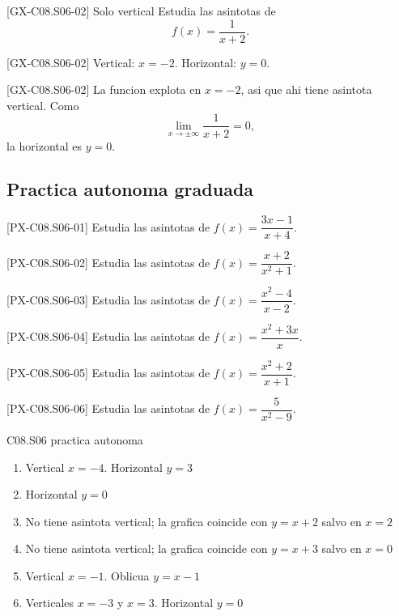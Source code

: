 \begin{guidedexercise}{[GX-C08.S06-02] Solo vertical}
Estudia las asintotas de
\[
f(x)=\frac{1}{x+2}.
\]
\end{guidedexercise}

\begin{shortanswer}{[GX-C08.S06-02]}
Vertical: \(x=-2\). Horizontal: \(y=0\).
\end{shortanswer}

\begin{fullsolution}{[GX-C08.S06-02]}
La funcion explota en \(x=-2\), asi que ahi tiene asintota vertical. Como
\[
\lim_{x\to\pm\infty}\frac{1}{x+2}=0,
\]
la horizontal es \(y=0\).
\end{fullsolution}

\subsection*{Practica autonoma graduada}
\begin{exercise}{[PX-C08.S06-01] Estudia las asintotas de \(f(x)=\dfrac{3x-1}{x+4}\).}
\end{exercise}
\begin{exercise}{[PX-C08.S06-02] Estudia las asintotas de \(f(x)=\dfrac{x+2}{x^2+1}\).}
\end{exercise}
\begin{exercise}{[PX-C08.S06-03] Estudia las asintotas de \(f(x)=\dfrac{x^2-4}{x-2}\).}
\end{exercise}
\begin{exercise}{[PX-C08.S06-04] Estudia las asintotas de \(f(x)=\dfrac{x^2+3x}{x}\).}
\end{exercise}
\begin{exercise}{[PX-C08.S06-05] Estudia las asintotas de \(f(x)=\dfrac{x^2+2}{x+1}\).}
\end{exercise}
\begin{exercise}{[PX-C08.S06-06] Estudia las asintotas de \(f(x)=\dfrac{5}{x^2-9}\).}
\end{exercise}

\begin{shortanswer}{C08.S06 practica autonoma}
\begin{enumerate}[label=\textbf{PX-C08.S06-\arabic*:}, leftmargin=*]
  \item Vertical \(x=-4\). Horizontal \(y=3\)
  \item Horizontal \(y=0\)
  \item No tiene asintota vertical; la grafica coincide con \(y=x+2\) salvo en \(x=2\)
  \item No tiene asintota vertical; la grafica coincide con \(y=x+3\) salvo en \(x=0\)
  \item Vertical \(x=-1\). Oblicua \(y=x-1\)
  \item Verticales \(x=-3\) y \(x=3\). Horizontal \(y=0\)
\end{enumerate}
\end{shortanswer}

